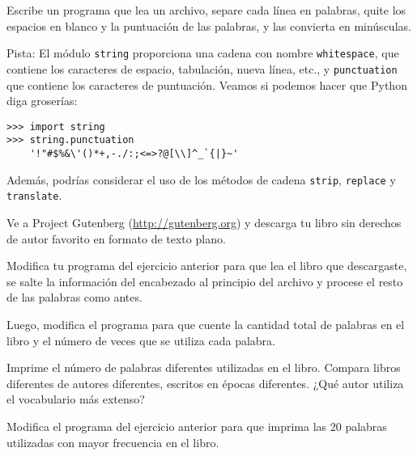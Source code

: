 \documentclass[10pt]{book}
\begin{document}
\begin{exercise}

Escribe un programa que lea un archivo, separe cada línea en
palabras, quite los espacios en blanco y la puntuación de las palabras,
y las convierta en minúsculas.

Pista: El módulo {\tt string} proporciona una cadena con nombre {\tt whitespace},
que contiene los caracteres de espacio, tabulación, nueva línea, etc.,
y {\tt punctuation} que contiene los caracteres de puntuación.  Veamos
si podemos hacer que Python diga groserías:

\begin{verbatim}
>>> import string
>>> string.punctuation
    '!"#$%&\'()*+,-./:;<=>?@[\\]^_`{|}~'
\end{verbatim}
%
Además, podrías considerar el uso de los métodos de cadena {\tt strip},
{\tt replace} y {\tt translate}.

\end{exercise}


\begin{exercise}

Ve a Project Gutenberg (\url{http://gutenberg.org}) y descarga
tu libro sin derechos de autor favorito en formato de texto plano.

Modifica tu programa del ejercicio anterior para que lea el libro
que descargaste, se salte la información del encabezado al principio
del archivo y procese el resto de las palabras como antes.

Luego, modifica el programa para que cuente la cantidad total de palabras en
el libro y el número de veces que se utiliza cada palabra.

Imprime el número de palabras diferentes utilizadas en el libro.  Compara
libros diferentes de autores diferentes, escritos en épocas diferentes.
¿Qué autor utiliza el vocabulario más extenso?
\end{exercise}


\begin{exercise}

Modifica el programa del ejercicio anterior para que imprima las
20 palabras utilizadas con mayor frecuencia en el libro.

\end{exercise}
\end{document}
